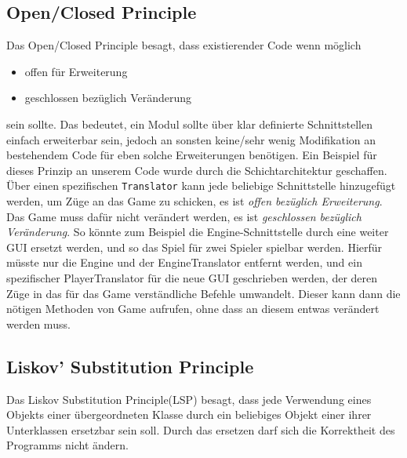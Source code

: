 \documentclass[
10pt, %
a4paper, %
oneside, %
headinclude,footinclude, %
BCOR5mm, %
]{scrartcl}
\begin{document}
\begin{onehalfspace}
\subsection{Open/Closed Principle}
Das Open/Closed Principle besagt, dass existierender Code wenn möglich
\begin{itemize}
	\item offen für Erweiterung
	\item geschlossen bezüglich Veränderung
\end{itemize}
sein sollte.
Das bedeutet, ein Modul sollte über klar definierte Schnittstellen einfach erweiterbar sein, jedoch an sonsten keine/sehr wenig Modifikation an bestehendem Code für eben solche Erweiterungen benötigen.
Ein Beispiel für dieses Prinzip an unserem Code wurde durch die Schichtarchitektur geschaffen. Über einen spezifischen \texttt{Translator} kann jede beliebige Schnittstelle hinzugefügt werden, um Züge an das Game zu schicken, es ist \textsl{offen bezüglich Erweiterung}. Das Game muss dafür nicht verändert werden, es ist \textsl{geschlossen bezüglich Veränderung}. So könnte zum Beispiel die Engine-Schnittstelle durch eine weiter GUI ersetzt werden, und so das Spiel für zwei Spieler spielbar werden. Hierfür müsste nur die Engine und der EngineTranslator entfernt werden, und ein spezifischer PlayerTranslator für die neue GUI geschrieben werden, der deren Züge in das für das Game verständliche Befehle umwandelt. Dieser kann dann die nötigen Methoden von Game aufrufen, ohne dass an diesem entwas verändert werden muss.
\subsection{Liskov' Substitution Principle}
Das Liskov Substitution Principle(LSP) besagt, dass jede Verwendung eines Objekts einer übergeordneten Klasse durch ein beliebiges Objekt einer ihrer Unterklassen ersetzbar sein soll. Durch das ersetzen darf sich die Korrektheit des Programms nicht ändern.


\end{onehalfspace}
\end{document}
